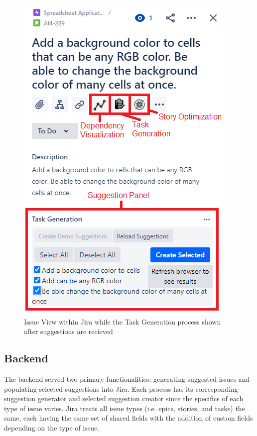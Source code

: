 \begin{figure}
\centerline{\includegraphics[width=\textwidth,height=\textheight,keepaspectratio]{./figure/Frontend.png}}
\caption{Issue View within Jira while the Task Generation process shown after suggestions are recieved}
\label{fig:issueView}
\end{figure}

\subsection{Backend}

The backend served two primary functionalities: generating suggested issues and populating selected suggestions into Jira. Each process has its corresponding suggestion generator and selected suggestion creator since the specifics of each type of issue varies. Jira treats all issue types (i.e. epics, stories, and tasks) the same, each having the same set of shared fields with the addition of custom fields depending on the type of issue.

